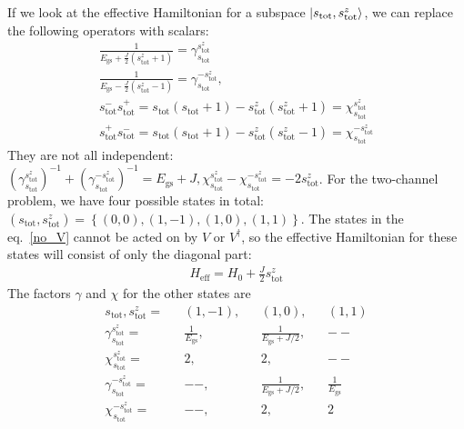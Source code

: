 \documentclass{revtex4-2}
\numberwithin{equation}{section}
\begin{document}
If we look at the effective Hamiltonian for a subspace \(\ket{s_\text{tot}, s^z_\text{tot}}\), we can replace the following operators with scalars:
\begin{gather}
	\frac{1}{E_\text{gs} + \frac{J}{2} \left(s_\text{tot}^z + 1\right)} = \gamma_{s_\text{tot}}^{s_\text{tot}^z}\\
	\frac{1}{E_\text{gs} - \frac{J}{2} \left(s_\text{tot}^z - 1\right)} = \gamma_{s_\text{tot}}^{-s_\text{tot}^z},\\
	s_\text{tot}^- s_\text{tot}^+ = s_\text{tot}\left(s_\text{tot} + 1\right) - s^z_\text{tot}\left(s^z_\text{tot} + 1\right) = \chi_{s_\text{tot}}^{s_\text{tot}^z}\\
	s_\text{tot}^+ s_\text{tot}^- = s_\text{tot}\left(s_\text{tot} + 1\right) - s^z_\text{tot}\left(s^z_\text{tot} - 1\right) = \chi_{s_\text{tot}}^{-s_\text{tot}^z}
\end{gather}
They are not all independent: \(\left(\gamma_{s_\text{tot}}^{s_\text{tot}^z}\right)^{-1} + \left(\gamma_{s_\text{tot}}^{-s_\text{tot}^z}\right)^{-1} =  E_\text{gs} + J, \chi_{s_\text{tot}}^{s_\text{tot}^z} - \chi_{s_\text{tot}}^{-s_\text{tot}^z} = -2 s^z_\text{tot}\). 
For the two-channel problem, we have four possible states in total: \(\left( s_\text{tot}, s_\text{tot}^z \right) = \left\{ (0,0), (1,-1), (1,0), (1,1) \right\} \). The states in the eq.~\ref{no_V} cannot be acted on by \(V\) or \(V^\dagger\), so the effective Hamiltonian for these states will consist of only the diagonal part:
\begin{equation}\begin{aligned}
	H_\text{eff} = H_0 + \frac{J}{2}s^z_\text{tot}
\end{aligned}\end{equation}
The factors \(\gamma\) and \(\chi\) for the other states are
\begin{equation}\begin{aligned}
	s_\text{tot}, s_\text{tot}^z = && (1,-1), && (1,0), && (1,1)\\
	\gamma_{s_\text{tot}}^{s_\text{tot}^z} = && \frac{1}{E_\text{gs}}, && \frac{1}{E_\text{gs} + J/2}, && -- \\
	\chi_{s_\text{tot}}^{s_\text{tot}^z} = && 2, && 2, && --\\
	\gamma_{s_\text{tot}}^{-s_\text{tot}^z} = && --, && \frac{1}{E_\text{gs} + J/2}, && \frac{1}{E_\text{gs}}\\
	\chi_{s_\text{tot}}^{-s_\text{tot}^z} = && --, && 2, && 2\\
\end{aligned}\end{equation}
\end{document}
